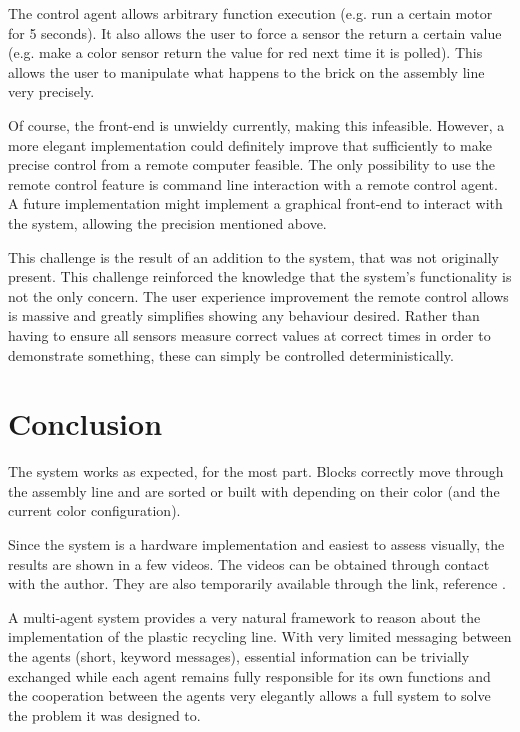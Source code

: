 \documentclass[conference]{IEEEtran}
\begin{document}
The control agent allows arbitrary function execution (e.g. run a certain motor for 5 seconds). It also allows the user to force a sensor the return a certain value (e.g. make a color sensor return the value for red next time it is polled). This allows the user to manipulate what happens to the brick on the assembly line very precisely. 

Of course, the front-end is unwieldy currently, making this infeasible. However, a more elegant implementation could definitely improve that sufficiently to make precise control from a remote computer feasible. The only possibility to use the remote control feature is command line interaction with a remote control agent. A future implementation might implement a graphical front-end to interact with the system, allowing the precision mentioned above.

This challenge is the result of an addition to the system, that was not originally present. This challenge reinforced the knowledge that the system's functionality is not the only concern. The user experience improvement the remote control allows is massive and greatly simplifies showing any behaviour desired. Rather than having to ensure all sensors measure correct values at correct times in order to demonstrate something, these can simply be controlled deterministically. 

\section{Conclusion}

The system works as expected, for the most part. Blocks correctly move through the assembly line and are sorted or built with depending on their color (and the current color configuration). 

Since the system is a hardware implementation and easiest to assess visually, the results are shown in a few videos. The videos can be obtained through contact with the author. They are also temporarily available through the link, reference \cite{resultslink}. 

A multi-agent system provides a very natural framework to reason about the implementation of the plastic recycling line. With very limited messaging between the agents (short, keyword messages), essential information can be trivially exchanged while each agent remains fully responsible for its own functions and the cooperation between the agents very elegantly allows a full system to solve the problem it was designed to.
\end{document}
